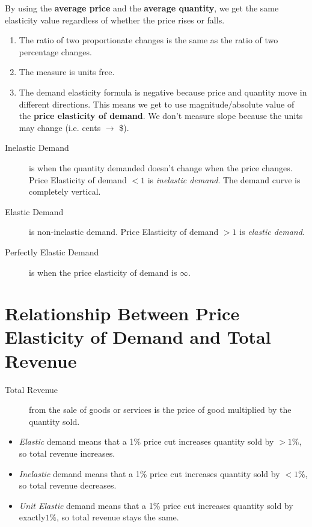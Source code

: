                 By using the \textbf{average price} and the \textbf{average quantity}, we get the same elasticity value regardless of whether the price rises or falls.

                \begin{enumerate}
                    \item The ratio of two proportionate changes is the same as the ratio of two percentage changes.
                    \item The measure is units free.
                    \item The demand elasticity formula is negative because price and quantity move in different directions.
                    This means we get to use magnitude/absolute value of the \textbf{price elasticity of demand}.
                    We don't measure slope because the units may change (i.e. cents $\to$ \$).
                \end{enumerate}

                \begin{description}
                    \item[Inelastic Demand] is when the quantity demanded doesn't change when the price changes.
                    Price Elasticity of demand $< 1$ is \emph{inelastic demand}.
                    The demand curve is completely vertical.
                    \item[Elastic Demand] is non-inelastic demand.
                    Price Elasticity of demand $> 1$ is \emph{elastic demand}.
                    \item[Perfectly Elastic Demand] is when the price elasticity of demand is $\infty$.
                \end{description}

            \section{Relationship Between Price Elasticity of Demand and Total Revenue} %
            \label{sec:relationship_between_price_elasticity_of_demand_and_total_revenue}
                \begin{description}
                    \item[Total Revenue] from the sale of goods or services is the price of good multiplied by the quantity sold.
                \end{description}
                \begin{itemize}
                    \item \emph{Elastic} demand means that a 1\% price cut increases quantity sold by $> 1 \%$, so total revenue increases.
                    \item \emph{Inelastic} demand means that a 1\% price cut increases quantity sold by $< 1 \%$, so total revenue decreases.
                    \item \emph{Unit Elastic} demand means that a 1\% price cut increases quantity sold by exactly$ 1 \%$, so total revenue stays the same.
                \end{itemize}

